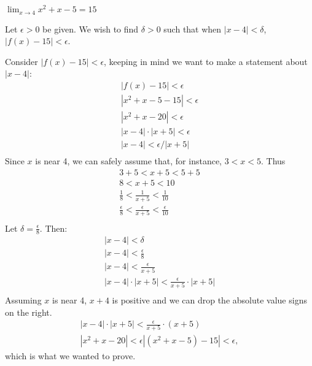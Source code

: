 {$\displaystyle \lim_{x\to 4} x^2+x-5 = 15$}
{Let $\epsilon >0$ be given. We wish to find $\delta >0$ such that when $|x-4|<\delta$, $|f(x)-15|<\epsilon$. 

Consider $|f(x)-15|<\epsilon$, keeping in  mind we want to make a statement about $|x-4|$:
\begin{gather*}
|f(x) -15 | < \epsilon \\
|x^2+x-5 -15 |<\epsilon \\
| x^2+x-20 | < \epsilon \\
| x-4 |\cdot|x+5| < \epsilon \\
| x-4 | < \epsilon/|x+5| \\
\end{gather*}
Since $x$ is near 4, we can safely assume that, for instance, $3<x<5$. Thus
\begin{gather*}
3+5<x+5<5+5 \\
8 < x+5 < 10 \\
\frac{1}{8} < \frac{1}{x+5} < \frac{1}{10} \\
\frac{\epsilon}{8} < \frac{\epsilon}{x+5} < \frac{\epsilon}{10} \\
\end{gather*}
Let $\delta =\frac{\epsilon}{8}$. Then:
\begin{gather*}
|x-4|<\delta \\
|x-4| < \frac{\epsilon}8\\
|x-4| < \frac{\epsilon}{x+5}\\
|x-4|\cdot|x+5| < \frac{\epsilon}{x+5}\cdot|x+5|\\
\end{gather*}
Assuming $x$ is near 4, $x+4$ is positive and we can drop the absolute value signs on the right.
\begin{gather*}
|x-4|\cdot|x+5| < \frac{\epsilon}{x+5}\cdot(x+5)\\
|x^2+x-20| < \epsilon
|(x^2+x-5) -15| < \epsilon,
\end{gather*}
which is what we wanted to prove.
}


